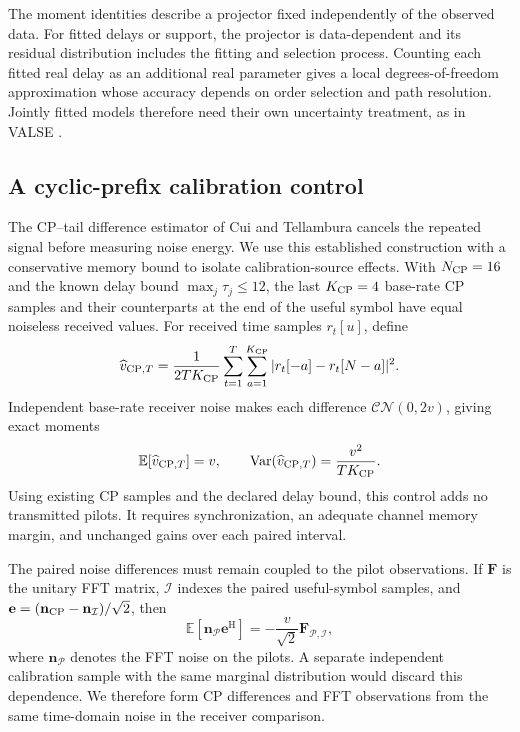 The moment identities describe a projector fixed independently of the observed
data. For fitted delays or support, the projector is data-dependent and its
residual distribution includes the fitting and selection process. Counting
each fitted real delay as an additional real parameter gives a local
degrees-of-freedom approximation whose accuracy depends on order selection
and path resolution. Jointly fitted models therefore need their own
uncertainty treatment, as in VALSE \cite{badiu2017valse}.

\subsection{A cyclic-prefix calibration control}
\label{sec:cpcontrol}
The CP--tail difference estimator of Cui and Tellambura
\cite[Eq.~(15)]{cui2006pdpnoise} cancels the repeated signal before measuring
noise energy. We use this established construction with a conservative memory
bound to isolate calibration-source effects. With $N_{\rm CP}=16$ and the
known delay bound $\max_j\tau_j\leq12$, the last $K_{\rm CP}=4$ base-rate CP
samples and their counterparts at the end of the useful symbol have equal
noiseless received values. For received time samples $r_t[u]$, define
\begin{equation}
 \widehat v_{{\rm CP},T}
 =\frac{1}{2TK_{\rm CP}}
   \sum_{t=1}^{T}\sum_{a=1}^{K_{\rm CP}}
       |r_t[-a]-r_t[N-a]|^2.
 \label{eq:cpnoise}
\end{equation}
Independent base-rate receiver noise makes each difference
$\mathcal{CN}(0,2v)$, giving exact moments
\begin{equation}
 \mathbb E[\widehat v_{{\rm CP},T}]=v,\qquad
 \operatorname{Var}(\widehat v_{{\rm CP},T})
       =\frac{v^2}{TK_{\rm CP}}.
 \label{eq:cpmoments}
\end{equation}
Using existing CP samples and the declared delay bound, this control adds no
transmitted pilots. It requires synchronization, an adequate channel memory
margin, and unchanged gains over each paired interval.

The paired noise differences must remain coupled to the pilot
observations. If $\mathbf F$ is the unitary FFT matrix, $\mathcal I$ indexes the
paired useful-symbol samples, and
$\mathbf e=(\mathbf n_{\rm CP}-\mathbf n_{\mathcal I})/\sqrt2$, then
\begin{equation}
 \mathbb E[\mathbf n_{\mathcal P}\mathbf e^{\mathrm H}]
       =-\frac{v}{\sqrt2}\mathbf F_{\mathcal P,\mathcal I},
 \label{eq:cpdependence}
\end{equation}
where $\mathbf n_{\mathcal P}$ denotes the FFT noise on the pilots.
A separate independent calibration sample with the same marginal distribution
would discard this dependence. We therefore form CP differences and FFT
observations from the same time-domain noise in the receiver comparison.

